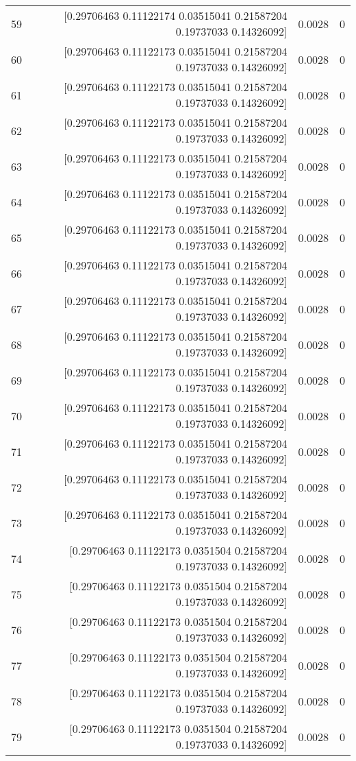 \begin{longtable}{lrrr}
59 & [0.29706463 0.11122174 0.03515041 0.21587204 0.19737033 0.14326092] & 0.0028 & 0 \\
60 & [0.29706463 0.11122173 0.03515041 0.21587204 0.19737033 0.14326092] & 0.0028 & 0 \\
61 & [0.29706463 0.11122173 0.03515041 0.21587204 0.19737033 0.14326092] & 0.0028 & 0 \\
62 & [0.29706463 0.11122173 0.03515041 0.21587204 0.19737033 0.14326092] & 0.0028 & 0 \\
63 & [0.29706463 0.11122173 0.03515041 0.21587204 0.19737033 0.14326092] & 0.0028 & 0 \\
64 & [0.29706463 0.11122173 0.03515041 0.21587204 0.19737033 0.14326092] & 0.0028 & 0 \\
65 & [0.29706463 0.11122173 0.03515041 0.21587204 0.19737033 0.14326092] & 0.0028 & 0 \\
66 & [0.29706463 0.11122173 0.03515041 0.21587204 0.19737033 0.14326092] & 0.0028 & 0 \\
67 & [0.29706463 0.11122173 0.03515041 0.21587204 0.19737033 0.14326092] & 0.0028 & 0 \\
68 & [0.29706463 0.11122173 0.03515041 0.21587204 0.19737033 0.14326092] & 0.0028 & 0 \\
69 & [0.29706463 0.11122173 0.03515041 0.21587204 0.19737033 0.14326092] & 0.0028 & 0 \\
70 & [0.29706463 0.11122173 0.03515041 0.21587204 0.19737033 0.14326092] & 0.0028 & 0 \\
71 & [0.29706463 0.11122173 0.03515041 0.21587204 0.19737033 0.14326092] & 0.0028 & 0 \\
72 & [0.29706463 0.11122173 0.03515041 0.21587204 0.19737033 0.14326092] & 0.0028 & 0 \\
73 & [0.29706463 0.11122173 0.03515041 0.21587204 0.19737033 0.14326092] & 0.0028 & 0 \\
74 & [0.29706463 0.11122173 0.0351504  0.21587204 0.19737033 0.14326092] & 0.0028 & 0 \\
75 & [0.29706463 0.11122173 0.0351504  0.21587204 0.19737033 0.14326092] & 0.0028 & 0 \\
76 & [0.29706463 0.11122173 0.0351504  0.21587204 0.19737033 0.14326092] & 0.0028 & 0 \\
77 & [0.29706463 0.11122173 0.0351504  0.21587204 0.19737033 0.14326092] & 0.0028 & 0 \\
78 & [0.29706463 0.11122173 0.0351504  0.21587204 0.19737033 0.14326092] & 0.0028 & 0 \\
79 & [0.29706463 0.11122173 0.0351504  0.21587204 0.19737033 0.14326092] & 0.0028 & 0 \\

\end{longtable}
